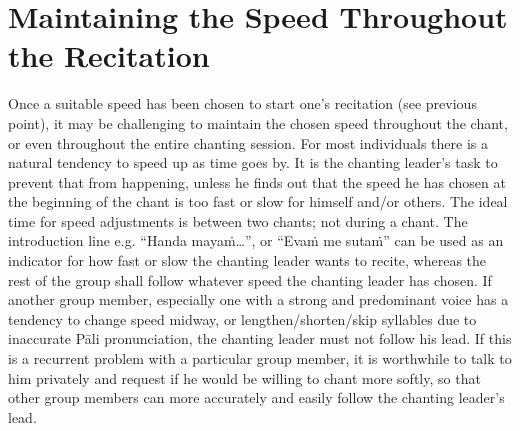 \section{Maintaining the Speed Throughout the Recitation}
Once a suitable speed has been chosen to start one’s recitation (see previous point), it may be challenging to maintain the chosen speed throughout the chant, or even throughout the entire chanting session. For most individuals there is a natural tendency to speed up as time goes by. It is the chanting leader’s task to prevent that from happening, unless he finds out that the speed he has chosen at the beginning of the chant is too fast or slow for himself and/or others. The ideal time for speed adjustments is between two chants; not during a chant. The introduction line e.g. “Handa mayaṁ…”, or “Evaṁ me sutaṁ” can be used as an indicator for how fast or slow the chanting leader wants to recite, whereas the rest of the group shall follow whatever speed the chanting leader has chosen. If another group member, especially one with a strong and predominant voice has a tendency to change speed midway, or lengthen/shorten/skip syllables due to inaccurate Pāli pronunciation, the chanting leader must not follow his lead. If this is a recurrent problem with a particular group member, it is worthwhile to talk to him privately and request if he would be willing to chant more softly, so that other group members can more accurately and easily follow the chanting leader’s lead.\\

